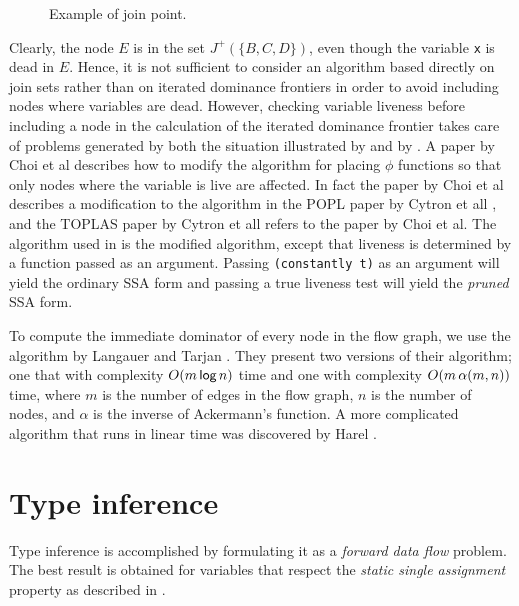 \begin{figure}
\begin{center}
\end{center}
\caption{\label{fig-ssa-join-2}
Example of join point.}
\end{figure}

Clearly, the node $E$ is in the set $J^+(\{B, C, D\})$, even though
the variable \texttt{x} is dead in $E$.  Hence, it is not sufficient
to consider an algorithm based directly on join sets rather than on
iterated dominance frontiers in order to avoid including nodes where
variables are dead.  However, checking variable liveness before
including a node in the calculation of the iterated dominance frontier
takes care of problems generated by both the situation illustrated by
 and by .  A paper by
Choi et al \cite{Choi:1991:ACS:99583.99594} describes how to modify
the algorithm for placing $\phi$ functions so that only nodes where
the variable is live are affected.  In fact the paper by Choi et al
describes a modification to the algorithm in the POPL paper by Cytron
et all \cite{Cytron:1989:EMC:75277.75280}, and the TOPLAS paper by
Cytron et all \cite{Cytron:1991:ECS:115372.115320} refers to the paper
by Choi et al.  The algorithm used in \sysname{} is the modified
algorithm, except that liveness is determined by a function passed as
an argument.  Passing \texttt{(constantly t)} as an argument will
yield the ordinary SSA form and passing a true liveness test will
yield the \emph{pruned} SSA form.

To compute the immediate dominator of every node in the flow graph, we
use the algorithm by Langauer and Tarjan
\cite{Lengauer:1979:FAF:357062.357071}.  They present two versions of
their algorithm; one that with complexity
$O(m \thinspace\textsf{log}\thinspace n)$ time and one with complexity
$O(m \thinspace\alpha (m, n))$ time, where $m$ is the number of edges
in the flow graph, $n$ is the number of nodes, and $\alpha$ is the
inverse of Ackermann's function.  A more complicated algorithm that
runs in linear time was discovered by Harel
\cite{Harel:1985:LAF:22145.22166}.

\section{Type inference}

Type inference is accomplished by formulating it as a \emph{forward
  data flow} problem.  The best result is obtained for variables that
respect the \emph{static single assignment} property as described in
. 

